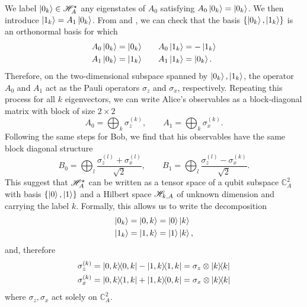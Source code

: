 We label $\ket{0_k} \in \mathscr{H}_A^\star$ any eigenstates of $A_0$ satisfying $A_0 \ket{0_k} = \ket{0_k} $.
We then introduce $\ket{1_k} = A_1 \ket{0_k}$.
From  and , we can check that the basis $\{\ket{0_k},\ket{1_k}\}$ is an orthonormal basis for which
\begin{equation}
	\begin{split}
		A_0 \ket{0_k} = \ket{0_k} \qquad & A_0 \ket{1_k} = -\ket{1_k} \\
		A_1 \ket{0_k} = \ket{1_k} \qquad & A_1 \ket{1_k} = \ket{0_k}.
	\end{split}
\end{equation}
Therefore, on the two-dimensional subspace spanned by $\ket{0_k},\ket{1_k}$, the operator $A_0$ and $A_1$ act as the Pauli operators $\sigma_z$ and $\sigma_x$, respectively. 
Repeating this process for all $k$ eigenvectors, we can write Alice's observables as a block-diagonal matrix with block of size $2 \times 2$
\begin{equation}
	A_0 = \bigoplus_k \sigma_z^{(k)}, \qquad A_1 = \bigoplus_k \sigma_x^{(k)}.
\end{equation}
Following the same steps for Bob, we find that his observables have the same block diagonal structure
\begin{equation}
	B_0 = \bigoplus_l \frac{\sigma_z^{(l)}+\sigma_x^{(l)}}{\sqrt{2}}, \qquad B_1 = \bigoplus_l \frac{\sigma_z^{(l)}-\sigma_x^{(k)}}{\sqrt{2}}.
\end{equation}
This suggest that $\mathscr{H}_A^\star$ can be written as a tensor space of a qubit subspace $\mathds{C}_A^2$ with basis $\{\ket{0},\ket{1}\}$ and a Hilbert space $\mathscr{H}_{k,A}$ of unknown dimension and carrying the label $k$.
Formally, this allows us to write the decomposition
\begin{equation}
	\begin{split}
		\ket{0_k} &= \ket{0,k} = \ket{0}\ket{k} \\
		\ket{1_k} &= \ket{1,k} = \ket{1}\ket{k},
	\end{split}	
\end{equation}
and, therefore
\begin{equation}
	\begin{split}
		\sigma_z^{(k)} &= \ketbra{0,k}-\ketbra{1,k} = \sigma_z \otimes \ketbra{k} \\
		\sigma_x^{(k)} &= \ketbra{0,k}{1,k}+\ketbra{1,k}{0,k} = \sigma_x \otimes \ketbra{k}
	\end{split}
\end{equation}
where $\sigma_z,\sigma_x$ act solely on $\mathds{C}^2_A$.
